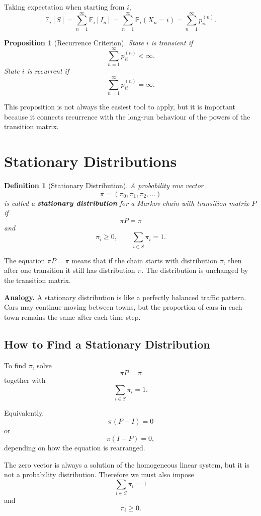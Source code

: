 \documentclass[12pt,a4paper]{article}
\theoremstyle{lecturestyle}
\newtheorem{definition}{Definition}
\newtheorem{proposition}{Proposition}
\newcommand{\Prob}{\mathbb{P}}
\newcommand{\E}{\mathbb{E}}
\begin{document}
Taking expectation when starting from $i$,
\[
\E_i[S]
=
\sum_{n=1}^{\infty}\E_i[I_n]
=
\sum_{n=1}^{\infty}\Prob_i(X_n=i)
=
\sum_{n=1}^{\infty}p_{ii}^{(n)}.
\]

\begin{proposition}[Recurrence Criterion]
State $i$ is transient if
\[
\sum_{n=1}^{\infty}p_{ii}^{(n)}<\infty.
\]
State $i$ is recurrent if
\[
\sum_{n=1}^{\infty}p_{ii}^{(n)}=\infty.
\]
\end{proposition}

This proposition is not always the easiest tool to apply, but it is important because it connects recurrence with the long-run behaviour of the powers of the transition matrix.

\section{Stationary Distributions}

\begin{definition}[Stationary Distribution]
A probability row vector
\[
\pi=(\pi_0,\pi_1,\pi_2,\ldots)
\]
is called a \textbf{stationary distribution} for a Markov chain with transition matrix $P$ if
\[
\pi P=\pi
\]
and
\[
\pi_i\geq 0,\qquad \sum_{i\in S}\pi_i=1.
\]
\end{definition}

The equation $\pi P=\pi$ means that if the chain starts with distribution $\pi$, then after one transition it still has distribution $\pi$. The distribution is unchanged by the transition matrix.

\textbf{Analogy.} A stationary distribution is like a perfectly balanced traffic pattern. Cars may continue moving between towns, but the proportion of cars in each town remains the same after each time step.

\subsection{How to Find a Stationary Distribution}

To find $\pi$, solve
\[
\pi P=\pi
\]
together with
\[
\sum_{i\in S}\pi_i=1.
\]

Equivalently,
\[
\pi(P-I)=0
\]
or
\[
\pi(I-P)=0,
\]
depending on how the equation is rearranged.

The zero vector is always a solution of the homogeneous linear system, but it is not a probability distribution. Therefore we must also impose
\[
\sum_{i\in S}\pi_i=1
\]
and
\[
\pi_i\geq 0.
\]
\end{document}
